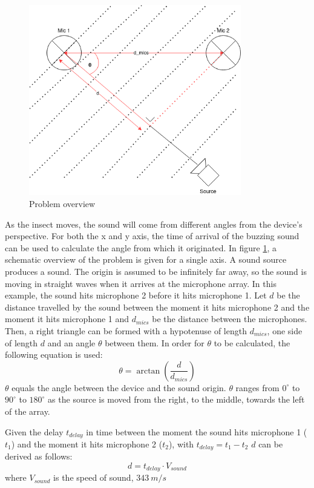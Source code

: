 \documentclass[a4paper]{article}
\begin{document}
\begin{figure}[H]
    \begin{center}
        \includegraphics[width=25em]{assets/problem_overview.png}
        \caption{Problem overview}
        \label{fig:problem_overview}
    \end{center}
\end{figure}

As the insect moves, the sound will come from different angles from the device's perspective. For both the x and y axis, the time of arrival of the buzzing sound can be used to calculate the angle from which it originated. In figure \ref{fig:problem_overview}, a schematic overview of the problem is given for a single axis. A sound source produces a sound. The origin is assumed to be infinitely far away, so the sound is moving in straight waves when it arrives at the microphone array. In this example, the sound hits microphone 2 before it hits microphone 1. Let $d$ be the distance travelled by the sound between the moment it hits microphone 2 and the moment it hits microphone 1 and $d_{mics}$ be the distance between the microphones. Then, a right triangle can be formed with a hypotenuse of length $d_{mics}$, one side of length $d$ and an angle $\theta$ between them. In order for $\theta$ to be calculated, the following equation is used:\[\theta = \arctan(\frac{d}{d_{mics}})\] $\theta$ equals the angle between the device and the sound origin. $\theta$ ranges from $0^{\circ}$ to $90^{\circ}$ to $180^{\circ}$ as the source is moved from the right, to the middle, towards the left of the array.

Given the delay $t_{delay}$ in time between the moment the sound hits microphone 1 ($t_1$) and the moment it hits microphone 2 ($t_2$), with $t_{delay} = t_1 - t_2$ $d$ can be derived as follows:\[d = t_{delay} \cdot V_{sound}\]where $V_{sound}$ is the speed of sound, $343\ m/s$
\end{document}
